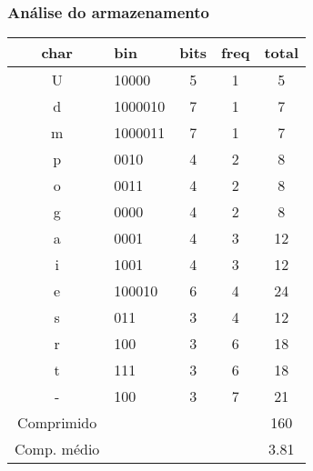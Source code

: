 \documentclass[10pt]{beamer}
\begin{document}
\begin{frame}[t]
    \frametitle{Análise do armazenamento}
    \begin{center}
        \begin{tabular}{clccc}
            char               & bin     & bits & freq & total \\
            \hline
            \pause U           & 10000   & 5    & 1    & 5     \\
            \pause d           & 1000010 & 7    & 1    & 7     \\
            \pause m           & 1000011 & 7    & 1    & 7     \\
            \pause p           & 0010    & 4    & 2    & 8     \\
            \pause o           & 0011    & 4    & 2    & 8     \\
            \pause g           & 0000    & 4    & 2    & 8     \\
            \pause a           & 0001    & 4    & 3    & 12    \\
            \pause i           & 1001    & 4    & 3    & 12    \\
            \pause e           & 100010  & 6    & 4    & 24    \\
            \pause s           & 011     & 3    & 4    & 12    \\
            \pause r           & 100     & 3    & 6    & 18    \\
            \pause t           & 111     & 3    & 6    & 18    \\
            \pause -           & 100     & 3    & 7    & 21    \\
            \hline
            \pause Comprimido  &         &      &      & 160   \\
            \pause Comp. médio &         &      &      & 3.81  \\
        \end{tabular}
    \end{center}

\end{frame}
\end{document}
